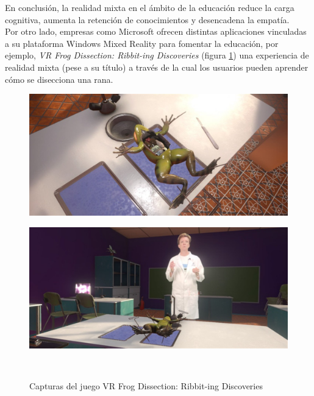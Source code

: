 En conclusión, la realidad mixta en el ámbito de la educación reduce la carga cognitiva, aumenta la retención de conocimientos y desencadena la empatía.\\




Por otro lado, empresas como Microsoft ofrecen distintas aplicaciones vinculadas a su plataforma Windows Mixed Reality para fomentar la educación, por ejemplo, \textit{VR Frog Dissection: Ribbit-ing Discoveries} (figura \ref{fig:vrfrogdissectioncapturas}) una experiencia de realidad mixta (pese a su título) a través de la cual los usuarios pueden aprender cómo se disecciona una rana.

\begin{figure}[htbp]
\centering
    \hspace{-4mm}
    \begin{minipage}{0.5\textwidth}
        \centering
        \includegraphics[scale=0.16]{Images/Estado del arte/frogDisection1.jpeg}\\
    \end{minipage}
    \begin{minipage}{0.5\textwidth}
        \centering
        \includegraphics[scale=0.16]{Images/Estado del arte/frogDisection2.jpeg}\\
    \end{minipage}\\
    \caption{Capturas del juego VR Frog Dissection: Ribbit-ing Discoveries}
    \label{fig:vrfrogdissectioncapturas}
\end{figure}

